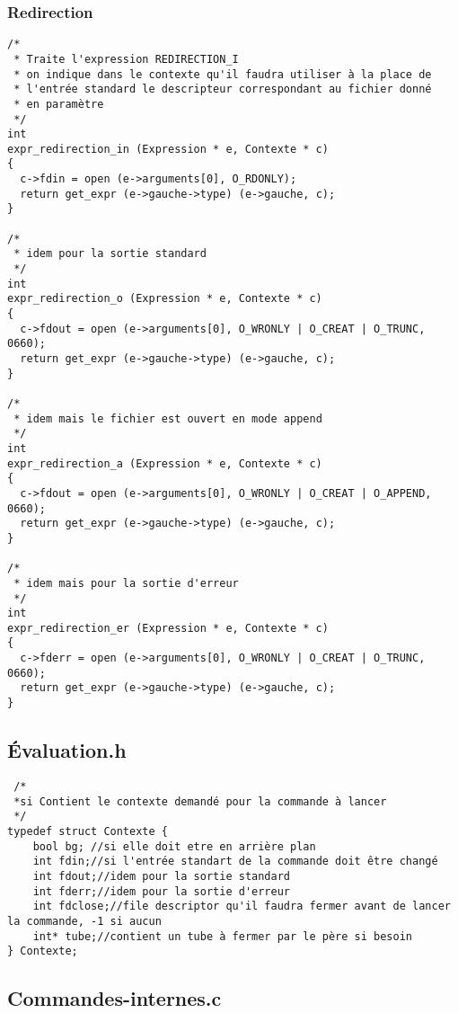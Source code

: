 \documentclass[12pt]{article}
\begin{document}
\subsubsection*{Redirection}
\label{redirection}
\begin{verbatim}
/*
 * Traite l'expression REDIRECTION_I
 * on indique dans le contexte qu'il faudra utiliser à la place de
 * l'entrée standard le descripteur correspondant au fichier donné
 * en paramètre
 */
int
expr_redirection_in (Expression * e, Contexte * c)
{
  c->fdin = open (e->arguments[0], O_RDONLY);
  return get_expr (e->gauche->type) (e->gauche, c);
}

/*
 * idem pour la sortie standard
 */
int
expr_redirection_o (Expression * e, Contexte * c)
{
  c->fdout = open (e->arguments[0], O_WRONLY | O_CREAT | O_TRUNC, 0660);
  return get_expr (e->gauche->type) (e->gauche, c);
}

/*
 * idem mais le fichier est ouvert en mode append
 */
int
expr_redirection_a (Expression * e, Contexte * c)
{
  c->fdout = open (e->arguments[0], O_WRONLY | O_CREAT | O_APPEND, 0660);
  return get_expr (e->gauche->type) (e->gauche, c);
}

/*
 * idem mais pour la sortie d'erreur
 */
int
expr_redirection_er (Expression * e, Contexte * c)
{
  c->fderr = open (e->arguments[0], O_WRONLY | O_CREAT | O_TRUNC, 0660);
  return get_expr (e->gauche->type) (e->gauche, c);
}
\end{verbatim}

\subsection{Évaluation.h}
\label{Eval.h}
\begin{verbatim}
 /*
 *si Contient le contexte demandé pour la commande à lancer
 */
typedef struct Contexte {
    bool bg; //si elle doit etre en arrière plan
    int fdin;//si l'entrée standart de la commande doit être changé
    int fdout;//idem pour la sortie standard
    int fderr;//idem pour la sortie d'erreur
    int fdclose;//file descriptor qu'il faudra fermer avant de lancer la commande, -1 si aucun
    int* tube;//contient un tube à fermer par le père si besoin
} Contexte;
\end{verbatim}

\subsection{Commandes-internes.c}
\end{document}
